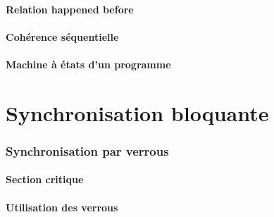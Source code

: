 \subsection{Relation happened before}



 
\subsection{Cohérence séquentielle}


 
\subsection{Machine à états d'un programme}



 
 
\part{Synchronisation bloquante}
 
 
\section{Synchronisation par verrous}
 
\subsection{Section critique}







 
\subsection{Utilisation des verrous}









 
